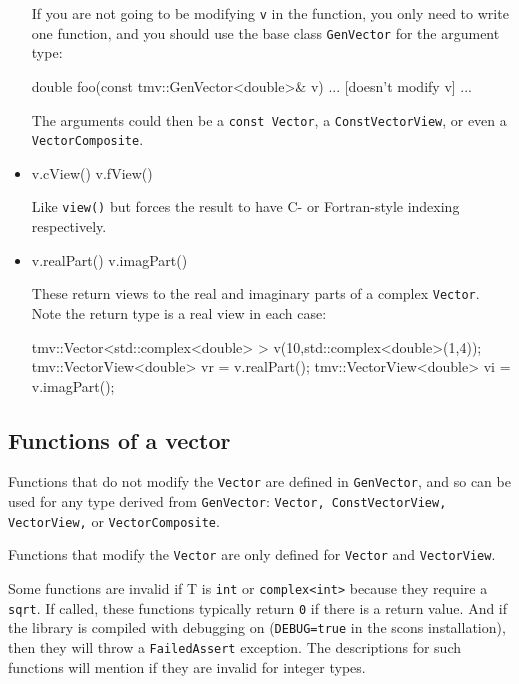 \documentclass[twoside,letterpaper,11pt]{article}
\renewcommand{\tt}[1]{{\lstinline {#1}}}
\begin{document}
\begin{itemize}
If you are not going to be modifying \tt{v} in the function, you only need to
write one function, and you should use the base class \tt{GenVector} 
for the argument type:
\begin{tmvcode}
double foo(const tmv::GenVector<double>& v)
{ ... [doesn't modify v] ... }
\end{tmvcode}
The arguments could then be a \tt{const Vector}, a \tt{ConstVectorView},
or even a \tt{VectorComposite}.

\item
\begin{tmvcode}
v.cView()
v.fView()
\end{tmvcode}
Like \tt{view()} but forces the result to have C- or Fortran-style indexing respectively.

\item
\begin{tmvcode}
v.realPart()
v.imagPart()
\end{tmvcode}
These return views to the real and imaginary parts of a complex \tt{Vector}.
Note the return type is a real view in each case:
\begin{tmvcode}
tmv::Vector<std::complex<double> > v(10,std::complex<double>(1,4));
tmv::VectorView<double> vr = v.realPart();
tmv::VectorView<double> vi = v.imagPart();
\end{tmvcode}

\end{itemize}

\subsection{Functions of a vector }
\label{Vector_Functions}

Functions that do not modify the \tt{Vector} are defined in 
\tt{GenVector}, and so can be used for any type derived from \tt{GenVector}:
\tt{Vector, ConstVectorView, VectorView,} or \tt{VectorComposite}.

Functions that modify the \tt{Vector} are only defined for 
\tt{Vector} and \tt{VectorView}.

Some functions are invalid if T is \tt{int} or \tt{complex<int>} because they require 
a \tt{sqrt}.  If called, these functions typically return \tt{0} if there is a return value.
And if the library is compiled with debugging on (\tt{DEBUG=true} in the scons installation),
then they will throw a \tt{FailedAssert} exception.  The descriptions for such functions
will mention if they are invalid for integer types.
\end{document}
